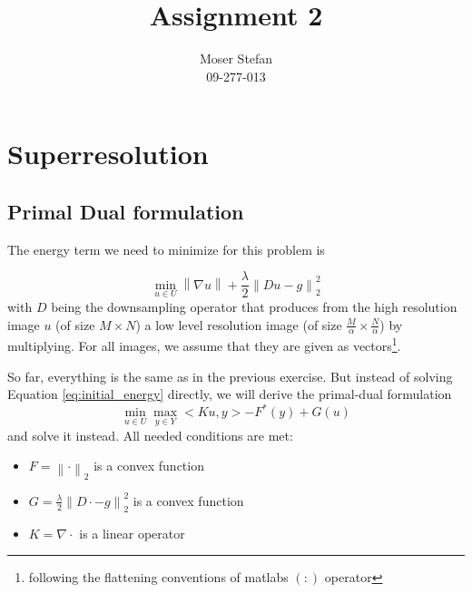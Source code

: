 \documentclass{paper}
\title{Assignment 2}
\author{Moser Stefan\\09-277-013}
\newcommand{\norm}[1]{\left\lVert#1\right\rVert}
\newcommand{\twonorm}[1]{\left\lVert#1\right\rVert_2}
\begin{document}
\maketitle


%

\section*{Superresolution}

\subsection*{Primal Dual formulation}
The energy term we need to minimize for this problem is

\begin{equation}
\min_{u \in U} \norm{\nabla u} + \frac{\lambda}{2} \twonorm{Du - g}^2
\label{eq:initial_energy}
\end{equation}
with $D$ being the downsampling operator that produces from the high 
resolution image $u$ (of size $M \times N$) a low level resolution image
(of size $\frac{M}{\alpha} \times \frac{N}{\alpha}$) by multiplying. 
For all images, we assume that they are given as vectors\footnote{following the flattening conventions of matlabs $(:)$ operator}.

So far, everything is the same as in the previous exercise. But instead of
solving Equation \eqref{eq:initial_energy} directly, we will derive the primal-dual
formulation
\begin{equation}
\min_{u \in U} \max_{y \in Y} < Ku, y > - F^*(y) + G(u)
\label{eq:dual_energy}
\end{equation}
and solve it instead. All needed conditions are met:
\begin{itemize}
\item $F = \norm{\cdot}_2$ is a convex function
\item $G = \frac{\lambda}{2}\twonorm{ D\cdot - g}^2$ is a convex function
\item $K = \nabla \cdot$ is a linear operator
\end{itemize}
\end{document}
